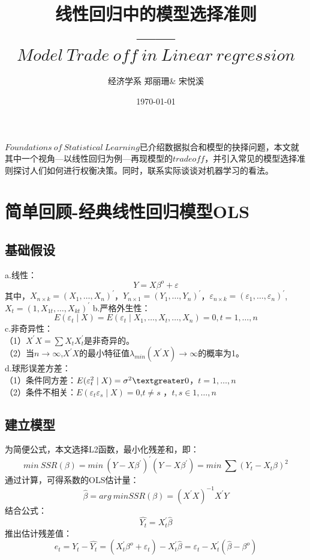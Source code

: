 \documentclass[12pt,a4paper]{article}
\begin{document}
\setlength{\leftskip}{20pt}
\title{线性回归中的模型选择准则\\——$Model\ Trade\ off\ in\ Linear\  regression$}

\author{经济学系 \quad 郑丽珊\& 宋悦溪}
\date{\today}

 \maketitle
 $ Foundations\ of\ Statistical \ Learning$已介绍数据拟合和模型的抉择问题，本文就其中一个视角—以线性回归为例—再现模型的$tradeoff$，并引入常见的模型选择准则探讨人们如何进行权衡决策。同时，联系实际谈谈对机器学习的看法。
 \section{简单回顾-经典线性回归模型OLS}
\subsection{基础假设}
 \noindent
a.线性：
$$Y=X\beta^{o}+\varepsilon$$
其中，$X_{n\times k}=(X_{1},…,X_{n})^{'}$，$Y_{n\times 1}=(Y_{1},…,Y_{n})^{'}$，$\varepsilon_{n\times k}=(\varepsilon_{1},…,\varepsilon_{n})^{'} $,$X_{t}=(1,X_{1t},…,X_{kt})^{'}$
b.严格外生性：
$$E(\varepsilon_{t}\mid X)=E(\varepsilon_{t}\mid X_{1},…,X_{t},…,X_{n})=0,t=1,…,n$$
c.非奇异性：\\
（1）$X^{'}X=\sum X_{t}X_{t}^{'}$是非奇异的。\\
（2）当$n\rightarrow\infty$,$X^{'}X$的最小特征值$\lambda_{min}(X^{'}X)\rightarrow\infty$的概率为1。\\
 \noindent
d.球形误差方差：\\
（1）条件同方差：$E(\varepsilon_{t}^{2}\mid X)=\sigma^{2}\textgreater 0$，$t=1,…,n$\\
（2）条件不相关：$E(\varepsilon_{t}\varepsilon_{s}\mid X)=0$,$t\neq s$ ，$t,s\in{1,…,n}$\\
\subsection{建立模型}
为简便公式，本文选择L2函数，最小化残差和，即：
$$min\ SSR(\beta)=min\ (Y-X\beta^{'})^{'}(Y-X\beta^{'})=min\ \sum(Y_{t}-X_{t}\beta)^{2}$$
 \noindent
 通过计算，可得系数的OLS估计量：
$$\widehat{\beta}=arg\ min SSR(\beta)=(X^{'}X)^{-1}X^{'}Y$$
 结合公式：
$$\widehat{Y_{t}}=X_{t}^{'}\widehat{\beta}$$
 推出估计残差值：$$e_{t}=Y_{t}-\widehat{Y_{t}}=(X_{t}^{'}\beta^{o}+\varepsilon_{t})-X_{t}^{'}\widehat{\beta}=\varepsilon_{t}-X_{t}^{'}(\widehat{\beta}-\beta^{o})$$
\end{document}
